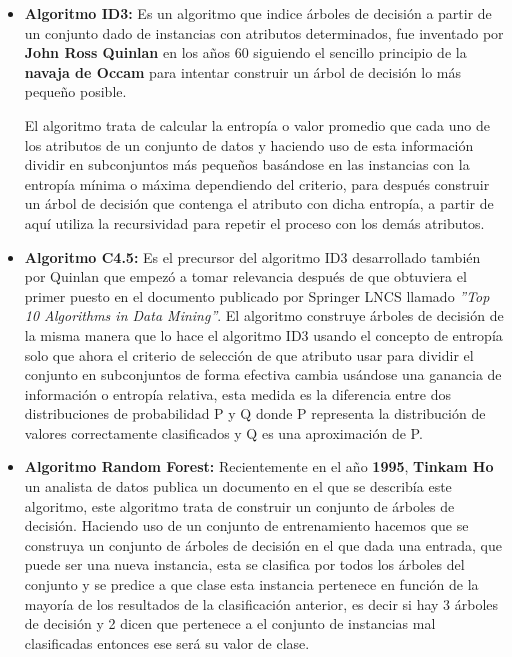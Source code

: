 \documentclass[a4paper, 11pt]{article} %
\begin{document}
\begin{itemize}
\item \textbf{Algoritmo ID3:} Es un algoritmo que indice árboles de decisión a partir de un conjunto dado de instancias con atributos determinados, fue inventado por \textbf{John Ross Quinlan} en los años 60 siguiendo el sencillo principio de la \textbf{navaja de Occam} para intentar construir un árbol de decisión lo más pequeño posible.

El algoritmo trata de calcular la entropía o valor promedio que cada uno de los atributos de un conjunto de datos y haciendo uso de esta información dividir en subconjuntos más pequeños basándose en las instancias con la entropía mínima o máxima dependiendo del criterio, para después construir un árbol de decisión que contenga el atributo con dicha entropía, a partir de aquí utiliza la recursividad para repetir el proceso con los demás atributos.
\item \textbf{Algoritmo C4.5:} Es el precursor del algoritmo ID3 desarrollado también por Quinlan que empezó a tomar relevancia después de que obtuviera el primer puesto  en el documento publicado por Springer LNCS llamado \textit{''Top 10 Algorithms in Data Mining''}.
El algoritmo construye árboles de decisión de la misma manera que lo hace el algoritmo ID3 usando el concepto de entropía solo que ahora el criterio de selección de que atributo usar para dividir el conjunto en subconjuntos de forma efectiva cambia usándose una ganancia de información o entropía relativa, esta medida es la diferencia entre dos distribuciones de probabilidad P y Q donde P representa la distribución de valores correctamente clasificados y Q  es una aproximación de P.
\item \textbf{Algoritmo Random Forest:} Recientemente en el año \textbf{1995}, \textbf{Tinkam Ho} un analista de datos publica un documento en el que se describía este algoritmo, este algoritmo trata de construir un conjunto de árboles de decisión. Haciendo uso de un conjunto de entrenamiento hacemos que se construya un conjunto de árboles de decisión en el que dada una entrada, que puede ser una nueva instancia, esta se clasifica por todos los árboles del conjunto y se predice a que clase esta instancia pertenece en función de la mayoría de los resultados de la clasificación anterior, es decir si hay 3 árboles de decisión y 2 dicen que pertenece a el conjunto de instancias mal clasificadas entonces ese será su valor de clase.
\end{itemize}
\end{document}
